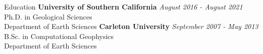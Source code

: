 \begin{rSection}{Education}
    {\bf University of Southern California} \hfill {\em August 2016 - August 2021} \\
    Ph.D. in Geological Sciences \\%
    Department of Earth Sciences
    \smallbreak
    {\bf Carleton University} \hfill {\em September 2007 - May 2013} \\
    B.Sc. in Computational Geophysics \\%
    Department of Earth Sciences  
\end{rSection}
